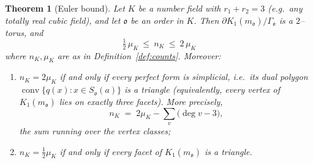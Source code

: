 \documentclass[11pt,reqno]{amsart}
\theoremstyle{plain}
\newtheorem{theorem}{Theorem}[section]
\theoremstyle{definition}
\newcommand{\conv}{\operatorname{conv}}
\newcommand{\Ok}{\mathfrak{o}}
\newcommand{\bdy}{\partial}
\newcommand{\nK}{n_K}
\newcommand{\muK}{\mu_K}
\begin{document}
\begin{theorem}[Euler bound]\label{thm:main}
Let $K$ be a number field with $r_1+r_2=3$ \textup{(}e.g.\ any totally real cubic field\textup{)}, and let
$\Ok$ be an order in $K$. Then $\bdy K_1(m_\Ok)/\Gamma_\Ok$ is a $2$--torus, and
\[
\boxed{\ \tfrac12\,\muK\ \le\ \nK\ \le\ 2\,\muK\ }
\]
where $\nK,\muK$ are as in Definition~\ref{def:counts}. Moreover:
\begin{enumerate}[label=\textup{(\alph*)},leftmargin=2.2em]
\item $\nK=2\muK$ if and only if every perfect form is \emph{simplicial}, i.e.\ its dual polygon
$\conv\{q(x):x\in S_\Ok(a)\}$ is a triangle \textup{(}equivalently, every vertex of $K_1(m_\Ok)$ lies on
exactly three facets\textup{)}. More precisely,
\begin{equation}\label{eq:defect}
\nK\;=\;2\muK-\sum_{v}\big(\deg v-3\big),
\end{equation}
the sum running over the vertex classes;
\item $\nK=\tfrac12\muK$ if and only if every facet of $K_1(m_\Ok)$ is a triangle.
\end{enumerate}
\end{theorem}
\end{document}
